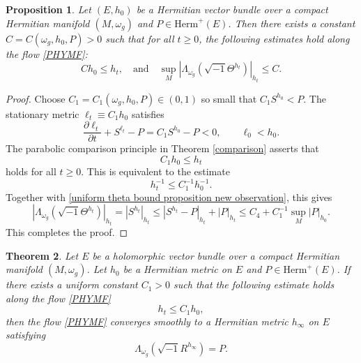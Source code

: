 \documentclass[12pt, reqno]{amsart}
\theoremstyle{plain}
\newtheorem{thm}{Theorem}[section]
\newtheorem{prop}[thm]{Proposition}
\theoremstyle{definition}
\newcommand{\btheorem}{\begin{thm}}
\newcommand{\etheorem}{\end{thm}}
\newcommand{\bproposition}{\begin{prop}}
\newcommand{\eproposition}{\end{prop}}
\newcommand{\bproof}{\begin{proof}}
\newcommand{\eproof}{\end{proof}}
\newcommand{\sq}{\sqrt{-1}}
\newcommand{\p}{\partial}
\newcommand{\beq}{\begin{equation}}
\newcommand{\eeq}{\end{equation}}
\newcommand{\qtq}[1]{\quad\mbox{#1}\quad}
\renewcommand{\>}{\rightarrow}
\renewcommand{\>}{\rightarrow}
\renewcommand{\p}{{\partial}}
\newcommand{\om}{\omega}
\numberwithin{equation}{section} %
\begin{document}
\bproposition\label{prop uniform Ric2 bound}
Let  $(E,h_0)$ be a Hermitian vector bundle over a compact Hermitian manifold
$(M,\omega_g)$ and $P\in \mathrm{Herm}^{+}(E)$. Then there exists a constant $C=C(\om_g,h_0,P)>0$ such that for all $t\geq 0$, the following estimates hold along the flow \eqref{PHYMF}:
\beq
C h_0\leq h_t,
 \qtq{and}
\sup_M\left| \Lambda_{\om_g}\left(\sq\Theta^{h_t}\right)\right|_{h_t} \leq C.
\eeq
\eproposition

\bproof
Choose $C_1=C_1(\om_g,h_0,P)\in(0,1)$ so small that
$C_1S^{h_0}<P$.  The stationary metric $\ell_t\equiv C_1h_0$ satisfies
\beq
\frac{\p \ell_t}{\p t}+S^{\ell_t}-P=C_1S^{h_0}-P<0,
\qquad \ell_0<h_0.
\eeq
The parabolic comparison principle in Theorem \ref{comparison} asserts that
\beq
C_1h_0\leq h_t
\label{uniform lower bound from barrier}
\eeq
holds for  all $t\geq0$. This is equivalent to the estimate $$h_t^{-1}\leq C_1^{-1}h_0^{-1}.$$  Together with \eqref{uniform theta bound proposition new observation}, this gives
\beq
\left|\Lambda_{\om_g}\left(\sq\Theta^{h_t}\right)\right|_{h_t}
=|S^{h_t}|_{h_t}
\leq |S^{h_t}-P|_{h_t}+|P|_{h_t}\leq C_4+C_1^{-1}\sup_M|P|_{h_0}.\eeq
This completes the proof.
\eproof



\btheorem \label{thm first case} Let  $E$ be a holomorphic vector bundle over a compact Hermitian manifold
$(M,\omega_g)$.  Let $h_0$ be a Hermitian metric on $E$ and  $P\in \mathrm{Herm}^+(E)$.
If there exists a uniform constant $C_1>0$ such that  the following estimate holds along the flow \eqref{PHYMF}
\beq h_t\leq C_1 h_0,\label{upper bound assumption}\eeq
then the flow \eqref{PHYMF} converges smoothly to a Hermitian metric $h_\infty$ on $E$ satisfying
\beq\Lambda_{\omega_g}\left(\sqrt{-1}R^{h_\infty}\right)=P.\eeq
\etheorem
\end{document}
